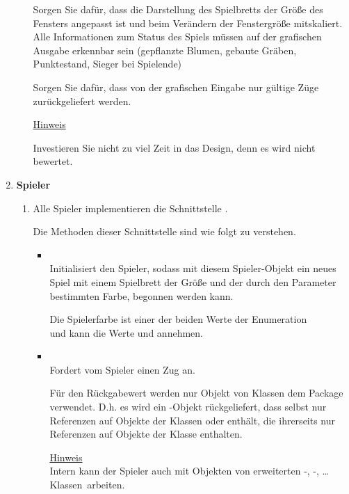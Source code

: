 \begin{enumerate}
\begin{enumerate}
Sorgen Sie dafür, dass die Darstellung des Spielbretts der Größe des Fensters angepasst ist und beim Verändern der Fenstergröße mitskaliert. Alle Informationen zum Status des Spiels müssen auf der grafischen Ausgabe erkennbar sein (gepflanzte Blumen, gebaute Gräben, Punktestand, Sieger bei Spielende)

Sorgen Sie dafür, dass von der grafischen Eingabe nur gültige Züge zurückgeliefert werden.

\underline{Hinweis}

Investieren Sie nicht zu viel Zeit in das Design, denn es wird nicht bewertet.

\end{enumerate}

\item \textbf{Spieler}
\label{impl:player}

\begin{enumerate}
\item

Alle Spieler implementieren die Schnittstelle .

Die Methoden dieser Schnittstelle sind wie folgt zu verstehen.

\begin{itemize}[leftmargin=4em]
\item[\code{init}] \hfill \\Initialisiert den Spieler, sodass mit diesem Spieler-Objekt ein neues Spiel mit einem Spielbrett der Größe  und der durch den Parameter  bestimmten Farbe, begonnen werden kann.

Die Spielerfarbe ist einer der beiden Werte der Enumeration \\
 und kann die Werte  und  annehmen.
\item[\code{request}] \hfill \\Fordert vom Spieler einen Zug an.

Für den Rückgabewert werden nur Objekt von Klassen dem Package  verwendet.
D.h. es wird ein -Objekt rückgeliefert, dass selbst nur Referenzen auf Objekte
der Klassen  oder  enthält, die ihrerseits nur 
Referenzen auf Objekte der Klasse  enthalten. 

\underline{Hinweis} \\ Intern kann der Spieler auch mit Objekten von erweiterten -, -, \ldots Klassen\
arbeiten. 



\end{itemize}
\end{enumerate}
\end{enumerate}
